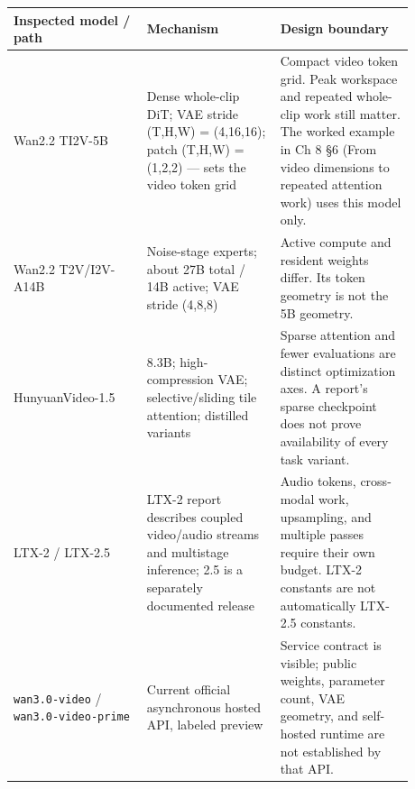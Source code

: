 \nopagebreak[4]
\begin{longtable}[]{@{}
  >{\raggedright\arraybackslash}p{0.2927\linewidth}
  >{\raggedright\arraybackslash}p{0.2927\linewidth}
  >{\raggedright\arraybackslash}p{0.2927\linewidth}@{}}
\toprule\noalign{}
\begin{minipage}[b]{\linewidth}\raggedright
Inspected model / path
\end{minipage} & \begin{minipage}[b]{\linewidth}\raggedright
Mechanism
\end{minipage} & \begin{minipage}[b]{\linewidth}\raggedright
Design boundary
\end{minipage} \\
\midrule\noalign{}
\endhead
\bottomrule\noalign{}
\endlastfoot
Wan2.2 TI2V-5B & Dense whole-clip DiT; VAE stride (T,H,W) = (4,16,16);
patch (T,H,W) = (1,2,2) --- sets the video token grid & Compact video
token grid. Peak workspace and repeated whole-clip work still matter.
The worked example in Ch 8 §6 (From video dimensions to repeated
attention work) uses this model only. \\
\noalign{\label{tab:27.4}}
Wan2.2 T2V/I2V-A14B & Noise-stage experts; about 27B total / 14B active;
VAE stride (4,8,8) & Active compute and resident weights differ. Its
token geometry is not the 5B geometry. \\
HunyuanVideo-1.5 & 8.3B; high-compression VAE; selective/sliding tile
attention; distilled variants & Sparse attention and fewer evaluations
are distinct optimization axes. A report's sparse checkpoint does not
prove availability of every task variant. \\
LTX-2 / LTX-2.5 & LTX-2 report describes coupled video/audio streams and
multistage inference; 2.5 is a separately documented release & Audio
tokens, cross-modal work, upsampling, and multiple passes require their
own budget. LTX-2 constants are not automatically LTX-2.5 constants. \\
\texttt{wan3.0-video} / \texttt{wan3.0-video-prime} & Current official
asynchronous hosted API, labeled preview & Service contract is visible;
public weights, parameter count, VAE geometry, and self-hosted runtime
are not established by that API. \\
\end{longtable}


